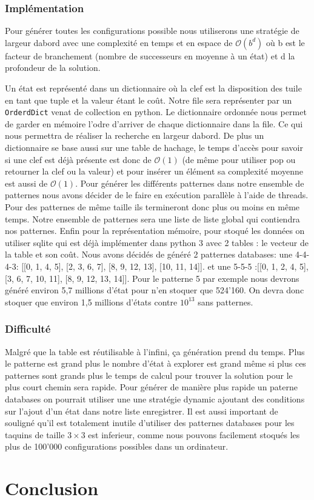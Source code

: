 \documentclass[a4paper, 12pt]{article}
\begin{document}
\subsubsection{Implémentation}
Pour générer toutes les configurations possible nous utiliserons une stratégie de largeur dabord avec une complexité en temps et en espace de $\mathcal{O}(b^{d})$ où b est le facteur de branchement (nombre de successeurs en moyenne à un état) et d la profondeur de la solution.

Un état est représenté dans un dictionnaire où la clef est la disposition des tuile en tant que tuple et la valeur étant le coût. Notre file sera représenter par un \lstinline{OrderdDict} venat de collection en python. Le dictionnaire ordonnée nous permet de garder en mémoire l'odre d'arriver de chaque dictionnaire dans la file. Ce qui nous permettra de réaliser la recherche en largeur dabord. De plus un dictionnaire se base aussi sur une table de hachage, le temps d'accès pour savoir si une clef est déjà présente est donc de $\mathcal{O}(1)$ (de même pour utiliser pop ou retourner la clef ou la valeur) et pour insérer un élément sa complexité moyenne est aussi de $\mathcal{O}(1)$.
    Pour générer les différents patternes dans notre ensemble de patternes nous avons décider de le faire en exécution parallèle à l'aide de threads. Pour des patternes de même taille ils termineront donc plus ou moins en même temps. Notre ensemble de patternes sera une liste de liste global qui contiendra nos patternes.
    Enfin pour la représentation mémoire, pour stoqué les données on utiliser sqlite qui est déjà implémenter dans python 3 avec 2 tables : le vecteur de la table et son coût.
    Nous avons décidés de généré 2 patternes databases: une 4-4-4-3: [[0, 1, 4, 5], [2, 3, 6, 7], [8, 9, 12, 13], [10, 11, 14]]. et une 5-5-5 :[[0, 1, 2, 4, 5], [3, 6, 7, 10, 11], [8, 9, 12, 13, 14]]. Pour le patterne 5 par exemple nous devrons généré environ 5,7 millions d'état pour n'en stoquer que 524'160. On devra donc stoquer que environ 1,5 millions d'états contre $10^{13}$ sans patternes.
    \subsubsection{Difficulté}
    Malgré que la table est réutilisable à l'infini, ça génération prend du temps. Plus le patterne est grand plus le nombre d'état à explorer est grand même si plus ces patternes sont grands plus le temps de calcul pour trouver la solution pour le plus court chemin sera rapide. Pour générer de manière plus rapide un paterne databases on pourrait utiliser une une stratégie dynamic ajoutant des conditions sur l'ajout d'un état dans notre liste enregistrer.
    Il est aussi important de souligné qu'il est totalement inutile d'utiliser des patternes databases pour les taquins de taille $3 \times 3$ est inferieur, comme nous pouvons facilement stoqués les plus de 100'000 configurations possibles dans un ordinateur.

\section{Conclusion}
\end{document}
